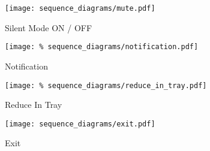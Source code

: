 \begin{figure}[]
	\centering
    \caption{Silent Mode ON / OFF}\label{fig:sd_silent_mode}
	\texttt{[image: sequence\_diagrams/mute.pdf]}
\end{figure}

\begin{figure}[]
	\centering
    \caption{Notification}\label{fig:sd_notification}
	\texttt{[image: \%
    sequence\_diagrams/notification.pdf]}
\end{figure}

\begin{figure}[]
	\centering
    \caption{Reduce In Tray}\label{fig:sd_reduce_in_tray}
	\texttt{[image: \%
    sequence\_diagrams/reduce\_in\_tray.pdf]}
\end{figure}

\begin{figure}[]
	\centering
    \caption{Exit}\label{fig:sd_exit}
	\texttt{[image: sequence\_diagrams/exit.pdf]}
\end{figure}
